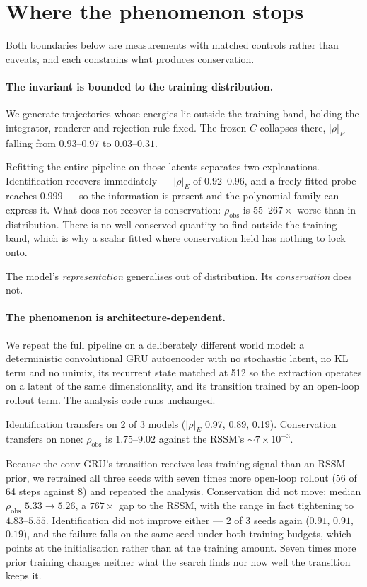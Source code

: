\section{Where the phenomenon stops}
\label{sec:boundaries}

Both boundaries below are measurements with matched controls rather than caveats, and each
constrains what produces conservation.

\paragraph{The invariant is bounded to the training distribution.}
We generate trajectories whose energies lie outside the training band, holding the integrator,
renderer and rejection rule fixed. The frozen $C$ collapses there, $|\rho|_E$ falling from
$0.93$--$0.97$ to $0.03$--$0.31$.

Refitting the entire pipeline on those latents separates two explanations. Identification recovers
immediately --- $|\rho|_E$ of $0.92$--$0.96$, and a freely fitted probe reaches $0.999$ --- so the
information is present and the polynomial family can express it. What does not recover is
conservation: $\rho_{\mathrm{obs}}$ is $55$--$267\times$ worse than in-distribution. There is no
well-conserved quantity to find outside the training band, which is why a scalar fitted where
conservation held has nothing to lock onto.

The model's \emph{representation} generalises out of distribution. Its \emph{conservation} does not.

\paragraph{The phenomenon is architecture-dependent.}
We repeat the full pipeline on a deliberately different world model: a deterministic convolutional
GRU autoencoder with no stochastic latent, no KL term and no unimix, its recurrent state matched at
512 so the extraction operates on a latent of the same dimensionality, and its transition trained by
an open-loop rollout term. The analysis code runs unchanged.

Identification transfers on 2 of 3 models ($|\rho|_E$ 0.97, 0.89, 0.19). Conservation transfers on
none: $\rho_{\mathrm{obs}}$ is $1.75$--$9.02$ against the RSSM's ${\sim}7\times10^{-3}$.

Because the conv-GRU's transition receives less training signal than an RSSM prior, we retrained all
three seeds with seven times more open-loop rollout (56 of 64 steps against 8) and repeated the
analysis. Conservation did not move: median $\rho_{\mathrm{obs}}$ $5.33 \to 5.26$, a $767\times$ gap
to the RSSM, with the range in fact tightening to $4.83$--$5.55$. Identification did not improve
either --- 2 of 3 seeds again ($0.91$, $0.91$, $0.19$), and the failure falls on the same seed under
both training budgets, which points at the initialisation rather than at the training amount. Seven
times more prior training changes neither what the search finds nor how well the transition keeps it.

